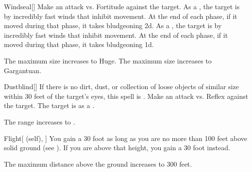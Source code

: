 \lowercase{\hypertarget{spell:Windseal}{}}\label{spell:Windseal}
\begin{freeability}[Rank 4]{\hypertarget{spell:Windseal}{Windseal}}[]
Make an attack vs. Fortitude against the target.
\hit As a , the target is  by incredibly fast winds that inhibit movement.
At the end of each phase, if it moved during that phase, it takes bludgeoning  \minus2d.
\crit As a , the target is  by incredibly fast winds that inhibit movement.
At the end of each phase, if it moved during that phase, it takes bludgeoning  \plus1d.

\rankline
{} The maximum size increases to Huge.
 The maximum size increases to Gargantuan.
\end{freeability}
\vspace{0.25em}



\lowercase{\hypertarget{spell:Dustblind}{}}\label{spell:Dustblind}
\begin{freeability}[Rank 5]{\hypertarget{spell:Dustblind}{Dustblind}}[]
If there is no dirt, dust, or collection of loose objects of similar size within 30 feet of the target's eyes, this spell is .
Make an attack vs. Reflex against the target.
\hit The target is  as a .

\rankline
{} The range increases to \rnglong.
\end{freeability}
\vspace{0.25em}



\lowercase{\hypertarget{spell:Flight}{}}\label{spell:Flight}
\begin{attuneability}[Rank 5]{\hypertarget{spell:Flight}{Flight}}[ (self), ]
You gain a 30 foot  as long as you are no more than 100 feet above solid ground (see ).
If you are above that height, you gain a 30 foot  instead.

\rankline
{} The maximum distance above the ground increases to 300 feet.
\end{attuneability}
\vspace{0.25em}



